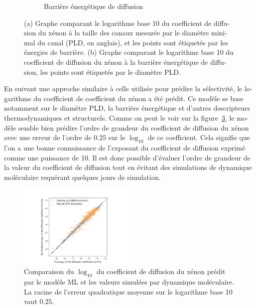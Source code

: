 \documentclass[thesis]{subfiles}
\begin{document}
\begin{otherlanguage}{french}
\begin{figure}[hb]
\begin{subfigure}[b]{0.48\textwidth}
      \caption{Barrière énergétique de diffusion}\label{fgr:barrier_diffusion_b_resume}
  \end{subfigure}
      \caption{ (a) Graphe comparant le logarithme base 10 du coefficient de diffusion du xénon à la taille des canaux mesurée par le diamètre minimal du canal (PLD, en anglais), et les points sont étiquetés par les énergies de barrière. (b) Graphe comparant le logarithme base 10 du coefficient de diffusion du xénon à la barrière énergétique de diffusion, les points sont étiquetés par le diamètre PLD. }\label{fgr:barrier_diffusion_resume}
  \end{figure}
  
En suivant une approche similaire à celle utilisée pour prédire la sélectivité, le logarithme du coefficient de coefficient du xénon a été prédit. Ce modèle se base notamment sur le diamètre PLD, la barrière énergétique et d'autres descripteurs thermodynamiques et structurels. Comme on peut le voir sur la figure~\ref{fgr:diff_pred_resume}, le modèle semble bien prédire l'ordre de grandeur du coefficient de diffusion du xénon avec une erreur de l'ordre de $0.25$ sur le $\log_{10}$ de ce coefficient. Cela signifie que l'on a une bonne connaissance de l'exposant du coefficient de diffusion exprimé comme une puissance de 10. Il est donc possible d'évaluer l'ordre de grandeur de la valeur du coefficient de diffusion tout en évitant des simulations de dynamique moléculaire requérant quelques jours de simulation.  

\begin{figure}[ht]
  \centering
  \includegraphics[width=0.5\textwidth]{figures/5-diffusion/diffusion_prediction.pdf}
  \caption{ Comparaison du $\log_{10}$ du coefficient de diffusion du xénon prédit par le modèle ML et les valeurs simulées par dynamique moléculaire. La racine de l'erreur quadratique moyenne sur le logarithme base 10 vaut $0.25$. }\label{fgr:diff_pred_resume}
\end{figure}



\end{otherlanguage}
\end{document}
